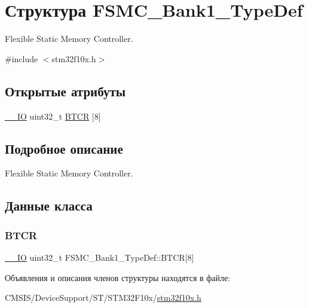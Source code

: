 \hypertarget{struct_f_s_m_c___bank1___type_def}{}\section{Структура F\+S\+M\+C\+\_\+\+Bank1\+\_\+\+Type\+Def}
\label{struct_f_s_m_c___bank1___type_def}


Flexible Static Memory Controller.  




{\ttfamily \#include $<$stm32f10x.\+h$>$}

\subsection*{Открытые атрибуты}
\begin{DoxyCompactItemize}
\item 
\mbox{\hyperlink{group___c_m_s_i_s___c_m3__core__definitions_gaec43007d9998a0a0e01faede4133d6be}{\+\_\+\+\_\+\+IO}} uint32\+\_\+t \mbox{\hyperlink{struct_f_s_m_c___bank1___type_def_a6d3aefd66a99e71ae4a22444a507a720}{B\+T\+CR}} \mbox{[}8\mbox{]}
\end{DoxyCompactItemize}


\subsection{Подробное описание}
Flexible Static Memory Controller. 

\subsection{Данные класса}
\mbox{\label{struct_f_s_m_c___bank1___type_def_a6d3aefd66a99e71ae4a22444a507a720}} 
\subsubsection{\texorpdfstring{BTCR}{BTCR}}
{\footnotesize\ttfamily \mbox{\hyperlink{group___c_m_s_i_s___c_m3__core__definitions_gaec43007d9998a0a0e01faede4133d6be}{\+\_\+\+\_\+\+IO}} uint32\+\_\+t F\+S\+M\+C\+\_\+\+Bank1\+\_\+\+Type\+Def\+::\+B\+T\+CR\mbox{[}8\mbox{]}}



Объявления и описания членов структуры находятся в файле\+:\begin{DoxyCompactItemize}
\item 
C\+M\+S\+I\+S/\+Device\+Support/\+S\+T/\+S\+T\+M32\+F10x/\mbox{\hyperlink{stm32f10x_8h}{stm32f10x.\+h}}\end{DoxyCompactItemize}
